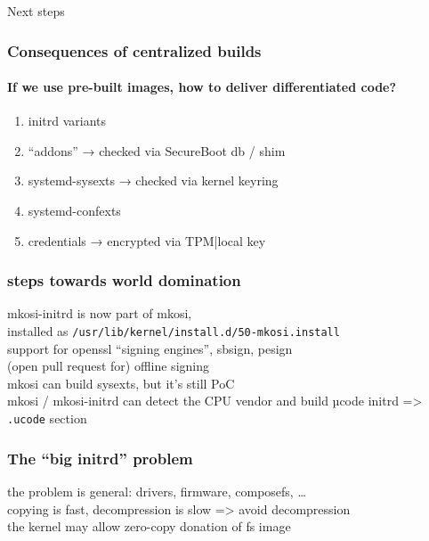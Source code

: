 \documentclass[]{beamer}
\newcommand\pp\pause
\newcommand{\secsec}[1]{\begin{frame}[c]\Huge \textsc #1\end{frame}}
\begin{document}
\secsec{Next steps}

\begin{frame}
  \frametitle{Consequences of centralized builds}
  \framesubtitle{If we use pre-built images, how to deliver differentiated code?}
  \pp

  \begin{enumerate}
    \addtocounter{enumi}{-1}
  \item initrd variants
  \item ``addons'' → checked via SecureBoot db / shim
  \item systemd-sysexts → checked via kernel keyring
  \item systemd-confexts
  \item credentials → encrypted via TPM|local key
  \end{enumerate}


\end{frame}

\begin{frame}
  \frametitle{steps towards world domination}

  \pp
  mkosi-initrd is now part of mkosi,\\
  installed as \texttt{/usr/lib/kernel/install.d/50-mkosi.install}
  \\

  \pp
  support for openssl ``signing engines'', sbsign, pesign\\
  \pp
  (open pull request for) offline signing
  \\
  
  \pp
  mkosi can build sysexts, but it's still PoC
  \\
  
  \pp
  mkosi / mkosi-initrd can detect the CPU vendor and build µcode initrd
  => \texttt{.ucode} section
\end{frame}

\begin{frame}
  \frametitle{The ``big initrd'' problem}

  \pp
  the problem is general: drivers, firmware, composefs, …
  \\

  \pp
  copying is fast, decompression is slow => avoid decompression
  \\

  \pp
  the kernel may allow zero-copy donation of fs image
\end{frame}
\end{document}
